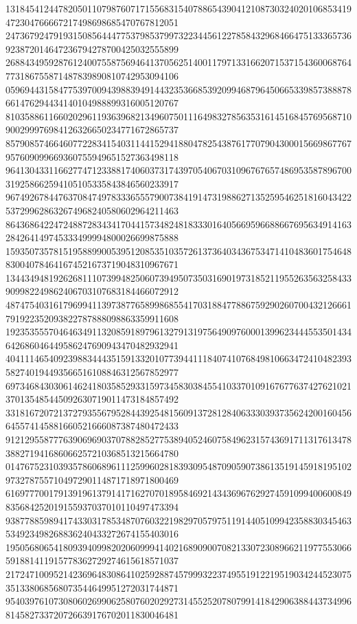 \begin{DoxyCode}
      131845412447820501107987607171556831540788654390412108730324020106853419472304766667217498698685470767812051
      247367924791931508564447753798537997322344561227858432968466475133365736923872014647236794278700425032555899
      268843495928761240075587569464137056251400117971331662071537154360068764773186755871487839890810742953094106
      059694431584775397009439883949144323536685392099468796450665339857388878661476294434140104988899316005120767
      810358861166020296119363968213496075011164983278563531614516845769568710900299976984126326650234771672865737
      857908574664607722834154031144152941880478254387617707904300015669867767957609099669360755949651527363498118
      964130433116627747123388174060373174397054067031096767657486953587896700319258662594105105335843846560233917
      967492678447637084749783336555790073841914731988627135259546251816043422537299628632674968240580602964211463
      864368642247248872834341704415734824818333016405669596688667695634914163284264149745333499994800026699875888
      159350735781519588990053951208535103572613736403436753471410483601754648830040784641674521673719048310967671
      134434948192626811107399482506073949507350316901973185211955263563258433909982249862406703107683184466072912
      487475403161796994113973877658998685541703188477886759290260700432126661791922352093822787888098863359911608
      192353555704646349113208591897961327913197564909760001399623444553501434642686046449586247690943470482932941
      404111465409239883444351591332010773944111840741076849810663472410482393582740194493566516108846312567852977
      697346843030614624180358529331597345830384554103370109167677637427621021370135485445092630719011473184857492
      331816720721372793556795284439254815609137281284063330393735624200160456645574145881660521666087387480472433
      912129558777639069690370788285277538940524607584962315743691711317613478388271941686066257210368513215664780
      014767523103935786068961112599602818393095487090590738613519145918195102973278755710497290114871718971800469
      616977700179139196137914171627070189584692143436967629274591099400600849835684252019155937037010110497473394
      938778859894174330317853487076032219829705797511914405109942358830345463534923498268836240433272674155403016
      195056806541809394099820206099941402168909007082133072308966211977553066591881411915778362729274615618571037
      217247100952142369648308641025928874579993223749551912219519034244523075351338068568073544649951272031744871
      954039761073080602699062580760202927314552520780799141842906388443734996814582733720726639176702011830046481

\end{DoxyCode}
